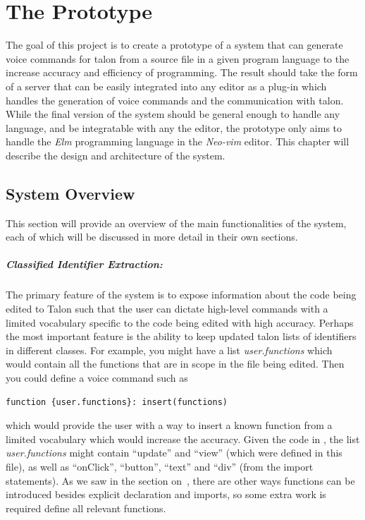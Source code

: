 \documentclass[../thesis.tex]{subfiles}
\begin{document}
\chapter{The Prototype}\label{the_project}
The goal of this project is to create a prototype of a system that can generate voice commands
for talon from a source file in a given program language to the increase accuracy and efficiency of programming.
The result should take the form of a server that can be easily integrated into any editor as a plug-in
which handles the generation of voice commands and the communication with talon.
While the final version of the system should be general enough to handle any language, and be integratable with any the editor,
the prototype only aims to handle the \textit{Elm} programming language in the \textit{Neo-vim} editor.
This chapter will describe the design and architecture of the system.

\section{System Overview}%
\label{sec:voice_command_generation}
This section will provide an overview of the main functionalities of the system,
each of which will be discussed in more detail in their own sections.

\paragraph{Classified Identifier Extraction:}%
\label{par:classified_identifier_extraction}
The primary feature of the system is to expose information about the code being edited
to Talon such that the user can dictate high-level commands with a limited vocabulary
specific to the code being edited with high accuracy.
Perhaps the most important feature is the ability to keep updated talon lists
of identifiers in different classes. For example, you might have a list \textit{user.functions} which would contain
all the functions that are in scope in the file being edited.
Then you could define a voice command such as 
\begin{verbatim}
function {user.functions}: insert(functions)
\end{verbatim} 
which would provide the user with a way to insert a known function from a limited vocabulary which would increase the accuracy.
Given the code in , the list \textit{user.functions} might contain ``update'' and ``view''
(which were defined in this file), as well as ``onClick'', ``button'', ``text'' and ``div'' (from the import statements).
As we saw in the section on~, there are other ways functions can be introduced
besides explicit declaration and imports, so some extra work is required define all relevant functions.
\end{document}
